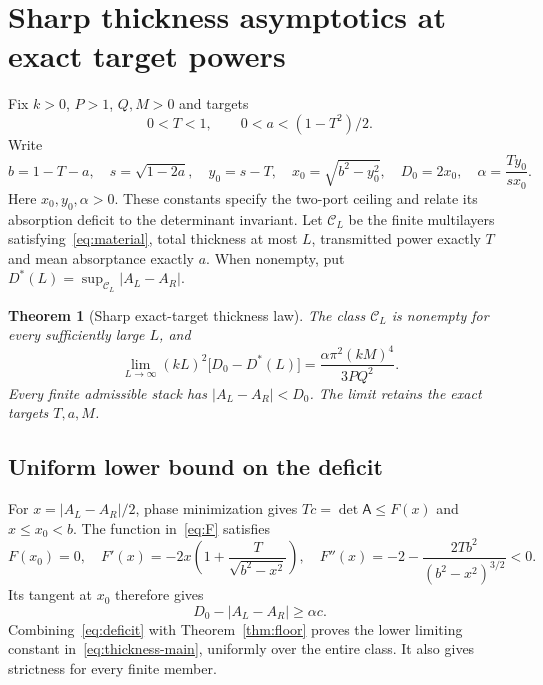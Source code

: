 \documentclass[11pt,a4paper]{article}
\newtheorem{theorem}{Theorem}[section]
\theoremstyle{remark}
\newcommand{\abs}[1]{\lvert #1\rvert}
\begin{document}
\section{Sharp thickness asymptotics at exact target powers}\label{sec:thickness}
Fix $k>0$, $P>1$, $Q,M>0$ and targets
\begin{equation}\label{eq:strict-target}
 0<T<1,\qquad 0<a<(1-T^2)/2.
\end{equation}
Write
\begin{equation}\label{eq:target-constants}
 b=1-T-a,\quad s=\sqrt{1-2a},\quad y_0=s-T,\quad
 x_0=\sqrt{b^2-y_0^2},\quad D_0=2x_0,\quad
 \alpha=\frac{Ty_0}{sx_0}.
\end{equation}
Here $x_0,y_0,\alpha>0$. These constants specify the two-port ceiling and relate its absorption deficit to the determinant invariant. Let $\mathcal C_L$ be the finite multilayers satisfying~\eqref{eq:material}, total thickness at most $L$, transmitted power exactly $T$ and mean absorptance exactly $a$. When nonempty, put $D^*(L)=\sup_{\mathcal C_L}\abs{A_L-A_R}$.

\begin{theorem}[Sharp exact-target thickness law]\label{thm:thickness}
The class $\mathcal C_L$ is nonempty for every sufficiently large $L$, and
\begin{equation}\label{eq:thickness-main}
 \lim_{L\to\infty}(kL)^2\bigl[D_0-D^*(L)\bigr]
 =\frac{\alpha\pi^2(kM)^4}{3PQ^2}.
\end{equation}
Every finite admissible stack has $\abs{A_L-A_R}<D_0$. The limit retains the exact targets $T,a,M$.
\end{theorem}

\subsection{Uniform lower bound on the deficit}
For $x=\abs{A_L-A_R}/2$, phase minimization gives $Tc=\det\mathsf A\leq F(x)$ and $x\leq x_0<b$. The function in~\eqref{eq:F} satisfies
\[
 F(x_0)=0,\quad F'(x)=-2x\left(1+\frac T{\sqrt{b^2-x^2}}\right),\quad
 F''(x)=-2-\frac{2Tb^2}{(b^2-x^2)^{3/2}}<0.
\]
Its tangent at $x_0$ therefore gives
\begin{equation}\label{eq:deficit}
 D_0-\abs{A_L-A_R}\geq\alpha c.
\end{equation}
Combining~\eqref{eq:deficit} with Theorem~\ref{thm:floor} proves the lower limiting constant in~\eqref{eq:thickness-main}, uniformly over the entire class. It also gives strictness for every finite member.
\end{document}
